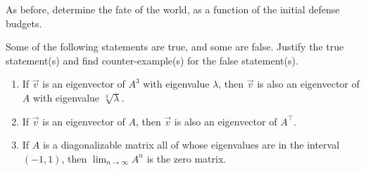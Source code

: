 \documentclass[addpoints]{exam}
\newcommand{\tr}{\intercal}
\begin{document}
\begin{questions}
\begin{parts}
As before, determine the fate of the world, as a function of the initial defense budgets.
\end{parts}

\question[10] Some of the following statements are true, and some are false. Justify the true statement(s) and find counter-example(s) for the false statement(s).
\begin{enumerate}[label={(\roman*)}]
\item If $\vec v$ is an eigenvector of $A^3$ with eigenvalue $\lambda$, then $\vec v$ is also an eigenvector of $A$ with eigenvalue $\sqrt[3]\lambda$.
\item If $\vec v$ is an eigenvector of $A$, then $\vec v$ is also an eigenvector of $A^\tr$.
\item If $A$ is a diagonalizable matrix all of whose eigenvalues are in the interval $(-1,1)$, then $\lim_{n\to\infty} A^n$ is the zero matrix.
\end{enumerate}

\end{questions}
\end{document}

